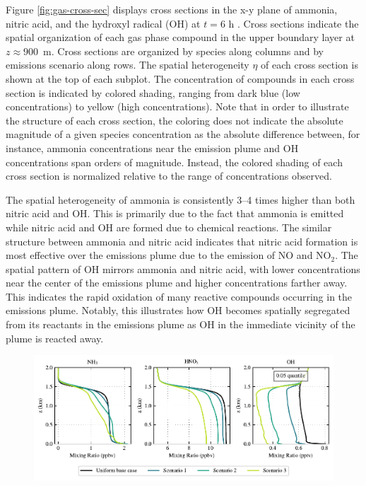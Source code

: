 \documentclass[journal abbreviation, manuscript]{copernicus}
\begin{document}
Figure \ref{fig:gas-cross-sec} displays cross sections in the x-y plane of ammonia, nitric acid, and the hydroxyl radical (OH) at $t=6$ h . Cross sections indicate the spatial organization of each gas phase compound in the upper boundary layer at  $z\approx900$~m. Cross sections are organized by species along columns and by emissions scenario along rows. The spatial heterogeneity $\eta$ of each cross section is shown at the top of each subplot. The concentration of compounds in each cross section is indicated by colored shading, ranging from dark blue (low concentrations) to yellow (high concentrations). Note that in order to illustrate the structure of each cross section, the coloring does not indicate the absolute magnitude of a given species concentration as the absolute difference between, for instance, ammonia concentrations near the emission plume and OH concentrations span orders of magnitude. Instead, the colored shading of each cross section is normalized relative to the range of concentrations observed. 

The spatial heterogeneity of ammonia is consistently 3--4 times higher than both nitric acid and OH. This is primarily due to the fact that ammonia is emitted while nitric acid and OH are formed due to chemical reactions. The similar structure between ammonia and nitric acid indicates that nitric acid formation is most effective over the emissions plume due to the emission of NO and NO$_2$. The spatial pattern of OH mirrors ammonia and nitric acid, with lower concentrations near the center of the emissions plume and higher concentrations farther away. This indicates the rapid oxidation of many reactive compounds occurring in the emissions plume. Notably, this illustrates how OH becomes spatially segregated from its reactants in the emissions plume as OH in the immediate vicinity of the plume is reacted away. 

\begin{figure}[!h]
	\centering
	\includegraphics[]{figures/aerosol-gas-vertical-profiles-time36.pdf}
	\caption{}
	\label{fig:gas-profiles}
\end{figure} 
\end{document}
